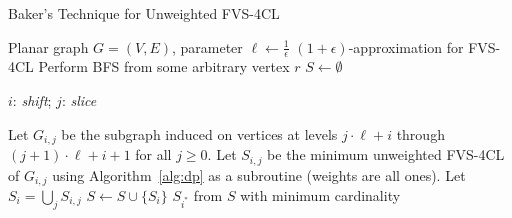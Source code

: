 \documentclass{beamer}
\begin{document}
\begin{frame}[fragile]{Baker's Technique for Unweighted FVS-4CL}
\small %
    \begin{algorithm}[H]
        \caption{Baker's technique for the unweighted FVS-4CL}
        \label{alg:unweighted_feedback_vertex_set_global}
        \begin{algorithmic}[1]
        \REQUIRE Planar graph $G = (V, E)$, parameter $\ell \leftarrow \frac{1}{\epsilon}$
        \ENSURE $(1 + \epsilon)$-approximation for \textsc{FVS-4CL}
        \STATE Perform \textsc{BFS} from some arbitrary vertex $r$ \label{alg3:line1}
        \STATE $S \leftarrow \emptyset$

        $i$: \textit{shift}; $j$: \textit{slice}

         \label{alg3:for-loop}
            \STATE Let $G_{i, j}$ be the subgraph induced on vertices at levels
            $j \cdot \ell + i$ through $(j+1) \cdot \ell + i + 1$ for all $j \geq 0$. \label{alg3:line4}
            \STATE Let $S_{i, j}$ be the minimum unweighted \textsc{FVS-4CL} of 
            $G_{i, j}$ using Algorithm~\ref{alg:dp} as a subroutine (weights are all ones). 
            \label{alg3:subroutine}
            \STATE Let $S_i = \bigcup_{j} S_{i, j}$ \label{alg3:line6}
            \STATE $S \leftarrow S \cup \{S_i\}$ \label{alg3:line7}
        \ENDFOR
        \RETURN $S_{i^*}$ from $S$ with minimum cardinality \label{alg3:line9}
        \end{algorithmic}
    \end{algorithm}
\end{frame}
\end{document}

